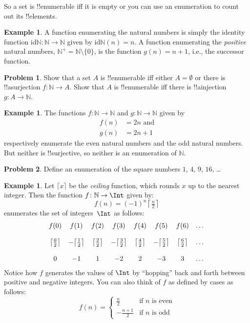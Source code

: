 \documentclass[10pt,a4paper]{article}
\theoremstyle{plain}
\theoremstyle{definition}
\newtheorem{ex}[thm]{Example}
\newtheorem{prob}{Problem}[section]
\theoremstyle{remark}
\newenvironment{explain}{}{}
\providecommand{\Nat}{\ensuremath{\mathbb{N}}}
\providecommand{\Id}{\mathrm{id}}
\begin{document}
\begin{explain}
So a set is !!{enumerable} iff it is empty or you can use an
enumeration to count out its !!{element}s.
\end{explain}

\begin{ex}
A function enumerating the natural numbers is simply the identity
function $\Id{\Nat} \colon \Nat \to \Nat$ given by $\Id{\Nat}(n) = n$. A
function enumerating the \emph{positive} natural numbers, $\Nat^+ =
\Nat \setminus \{0\}$, is the function $g(n) = n + 1$, i.e., the
successor function.
\end{ex}

\begin{prob}
Show that a set $A$ is !!{enumerable} iff either $A = \emptyset$ or
there is !!a{surjection} $f\colon \Nat \to A$. Show that $A$ is
!!{enumerable} iff there is !!a{injection} $g\colon A \to \Nat$. 
\end{prob}

\begin{ex}
The functions $f\colon \Nat \to \Nat$ and $g \colon \Nat \to \Nat$
given by
\begin{align*}
  f(n) & = 2n \text{ and}\\
  g(n) & = 2n+1
\end{align*}
respectively enumerate the even natural numbers and the odd natural
numbers. But neither is !!{surjective}, so neither is an enumeration
of $\Nat$.
\end{ex}

\begin{prob}
Define an enumeration of the square numbers $1$, $4$, $9$, $16$, \dots
\end{prob}

\begin{ex}
Let $\lceil x \rceil$ be the \emph{ceiling} function, which rounds $x$
up to the nearest integer. Then the function $f \colon \Nat \to \Int$
given by:
\[
  f(n) = (-1)^{n} \left\lceil\tfrac{n}{2}\right\rceil
\]
enumerates the set of
integers~$\Int$ as follows:
\[
\begin{array}{c c c c c c c c}
f(0) & f(1) & f(2) & f(3) & f(4) & f(5) & f(6) & \dots \\ \\
\big\lceil \tfrac{0}{2} \big\rceil & -\big\lceil \tfrac{1}{2}\big\rceil &  \big\lceil \tfrac{2}{2} \big\rceil & -\big\lceil \tfrac{3}{2} \big\rceil & \big\lceil \tfrac{4}{2} \big\rceil  & -\big\lceil \tfrac{5}{2}\big\rceil & \big\lceil \tfrac{6}{2} \big\rceil & \dots \\ \\
0 & -1 & 1 & -2 & 2 & -3 & 3& \dots
\end{array}
\]
Notice how $f$ generates the values of $\Int$ by ``hopping'' back and
forth between positive and negative integers. You can also think of
$f$ as defined by cases as follows:
\[
f(n) = \begin{cases}
  \frac{n}{2} & \text{if $n$ is even}\\
  -\frac{n+1}{2} & \text{if $n$ is odd}
  \end{cases}
\]
\end{ex}
\end{document}
